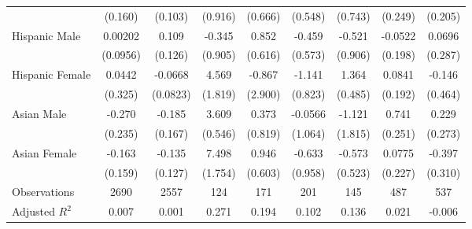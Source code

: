 \begin{sidewaystable}
{\begin{longtable}{l*{8}{c}}
                    &     (0.160)         &     (0.103)         &     (0.916)         &     (0.666)         &     (0.548)         &     (0.743)         &     (0.249)         &     (0.205)         \\
[1em]
Hispanic Male       &     0.00202         &       0.109         &      -0.345         &       0.852         &      -0.459         &      -0.521         &     -0.0522         &      0.0696         \\
                    &    (0.0956)         &     (0.126)         &     (0.905)         &     (0.616)         &     (0.573)         &     (0.906)         &     (0.198)         &     (0.287)         \\
[1em]
Hispanic Female     &      0.0442         &     -0.0668         &       4.569\sym{*}  &      -0.867         &      -1.141         &       1.364\sym{**} &      0.0841         &      -0.146         \\
                    &     (0.325)         &    (0.0823)         &     (1.819)         &     (2.900)         &     (0.823)         &     (0.485)         &     (0.192)         &     (0.464)         \\
[1em]
Asian Male          &      -0.270         &      -0.185         &       3.609\sym{***}&       0.373         &     -0.0566         &      -1.121         &       0.741\sym{**} &       0.229         \\
                    &     (0.235)         &     (0.167)         &     (0.546)         &     (0.819)         &     (1.064)         &     (1.815)         &     (0.251)         &     (0.273)         \\
[1em]
Asian Female        &      -0.163         &      -0.135         &       7.498\sym{***}&       0.946         &      -0.633         &      -0.573         &      0.0775         &      -0.397         \\
                    &     (0.159)         &     (0.127)         &     (1.754)         &     (0.603)         &     (0.958)         &     (0.523)         &     (0.227)         &     (0.310)         \\
\hline
Observations        &        2690         &        2557         &         124         &         171         &         201         &         145         &         487         &         537         \\
Adjusted \(R^{2}\)  &       0.007         &       0.001         &       0.271         &       0.194         &       0.102         &       0.136         &       0.021         &      -0.006         \\

\end{longtable}}
\end{sidewaystable}
